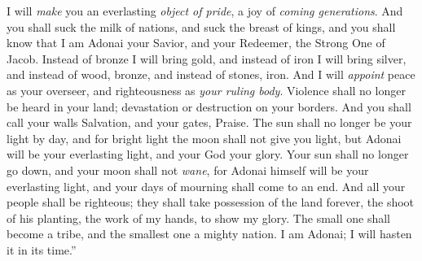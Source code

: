 \begin{biblechapter}
I will \textit{make} you an everlasting \textit{object of pride}, 
a joy of \textit{coming generations}.
\verse And you shall suck the milk of nations, 
and suck the breast of kings, 
and you shall know that I am Adonai your Savior, 
and your Redeemer, the Strong One of Jacob.
\verse Instead of bronze I will bring gold, 
and instead of iron I will bring silver, 
and instead of wood, bronze, 
and instead of stones, iron. 
And I will \textit{appoint} peace as your overseer, 
and righteousness as \textit{your ruling body}.
\verse Violence shall no longer be heard in your land; 
devastation or destruction on your borders. 
And you shall call your walls Salvation, 
and your gates, Praise.
\verse The sun shall no longer be your light by day, 
and for bright light the moon shall not give you light, 
but Adonai will be your everlasting light, 
and your God your glory.
\verse Your sun shall no longer go down, 
and your moon shall not \textit{wane}, 
for Adonai himself will be your everlasting light, 
and your days of mourning shall come to an end.
\verse And all your people shall be righteous; 
they shall take possession of the land forever, 
the shoot of his planting, 
the work of my hands, to show my glory.
\verse The small one shall become a tribe, 
and the smallest one a mighty nation. I am Adonai; I will hasten it in its time.”
\end{biblechapter}

